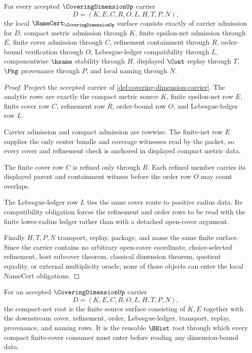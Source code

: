 \begin{theorem}
\label{thm:covering-dimension-namecert-obligations}
For every accepted $\CoveringDimensionUp$ carrier
$$
D=(K,E,C,R,O,L,H,T,P,N),
$$
the local $\NameCert_{\CoveringDimensionUp}$ surface consists exactly of carrier admission for $D$, compact metric admission through $K$, finite epsilon-net admission through $E$, finite cover admission through $C$, refinement containment through $R$, order-bound verification through $O$, Lebesgue-ledger compatibility through $L$, componentwise $\hsame$ stability through $H$, displayed $\Cont$ replay through $T$, $\Pkg$ provenance through $P$, and local naming through $N$.
\end{theorem}
\begin{proof}
Project the accepted carrier of \autoref{def:covering-dimension-carrier}. The analytic rows are exactly the compact metric source $K$, finite epsilon-net row $E$, finite cover row $C$, refinement row $R$, order-bound row $O$, and Lebesgue-ledger row $L$.

Carrier admission and compact admission are rowwise. The finite-net row $E$ supplies the only center bundle and coverage witnesses read by the packet, so every cover and refinement check is anchored in displayed compact metric data.

The finite cover row $C$ is refined only through $R$. Each refined member carries its displayed parent and containment witness before the order row $O$ may count overlaps.

The Lebesgue-ledger row $L$ ties the same cover route to positive radius data. Its compatibility obligation forces the refinement and order rows to be read with the finite lower-radius ledger rather than with a detached open-cover argument.

Finally $H,T,P,N$ transport, replay, package, and name the same finite surface. Since the carrier contains no arbitrary open-cover coordinate, choice-selected refinement, host subcover theorem, classical dimension theorem, quotient equality, or external multiplicity oracle, none of those objects can enter the local NameCert obligations.
\end{proof}

\begin{definition}
\label{def:covering-dimension-compact-net-root}
For an accepted $\CoveringDimensionUp$ carrier
$$
D=(K,E,C,R,O,L,H,T,P,N),
$$
the compact-net root is the finite source surface consisting of $K,E$ together with the downstream cover, refinement, order, Lebesgue-ledger, transport, replay, provenance, and naming rows. It is the reusable $\BHist$ root through which every compact finite-cover consumer must enter before reading any dimension-bound data.
\end{definition}

